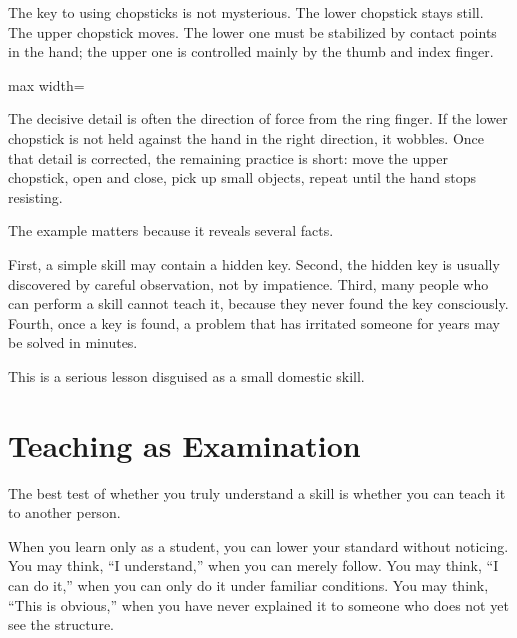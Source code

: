The key to using chopsticks is not mysterious. The lower chopstick stays still. The upper chopstick moves. The lower one must be stabilized by contact points in the hand; the upper one is controlled mainly by the thumb and index finger.

\begin{center}
\begin{adjustbox}{max width=\linewidth}
\end{adjustbox}
\end{center}

The decisive detail is often the direction of force from the ring finger. If the lower chopstick is not held against the hand in the right direction, it wobbles. Once that detail is corrected, the remaining practice is short: move the upper chopstick, open and close, pick up small objects, repeat until the hand stops resisting.

The example matters because it reveals several facts.

First, a simple skill may contain a hidden key. Second, the hidden key is usually discovered by careful observation, not by impatience. Third, many people who can perform a skill cannot teach it, because they never found the key consciously. Fourth, once a key is found, a problem that has irritated someone for years may be solved in minutes.

This is a serious lesson disguised as a small domestic skill.

\section*{Teaching as Examination}

The best test of whether you truly understand a skill is whether you can teach it to another person.

When you learn only as a student, you can lower your standard without noticing. You may think, ``I understand,'' when you can merely follow. You may think, ``I can do it,'' when you can only do it under familiar conditions. You may think, ``This is obvious,'' when you have never explained it to someone who does not yet see the structure.

